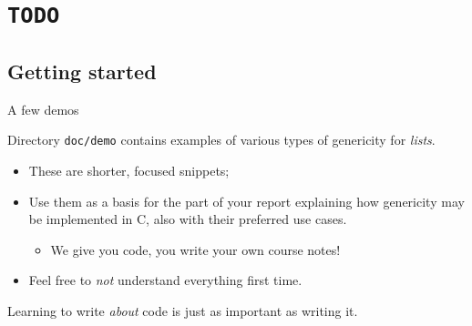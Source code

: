 \section{\lstinline{TODO}}

\subsection{Getting started}

\begin{frame}[fragile]{A few demos}

  Directory \lstinline{doc/demo} contains examples of various types of genericity for {\em lists}.

  \begin{itemize}
  \item These are shorter, focused snippets;
  \item Use them as a basis for the part of your report explaining how genericity may be implemented in C, also with their preferred use cases.
    \begin{itemize}
    \item We give you code, you write your own course notes!
    \end{itemize}
  \item Feel free to {\em not} understand everything first time.
  \end{itemize}

  Learning to write {\em about} code is just as important as writing it.
  
\end{frame}


